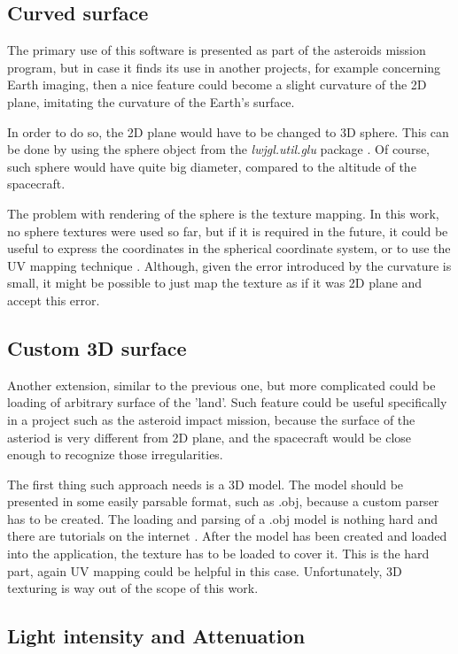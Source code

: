 \documentclass[english,12pt,a4paper,pdftex,elec,utf8]{aaltothesis}
\begin{document}
\subsection*{Curved surface}

The primary use of this software is presented as part of the asteroids mission program, but in case it finds its use in another projects, for example concerning Earth imaging, then a nice feature could become a slight curvature of the 2D plane, imitating the curvature of the Earth's surface. 

In order to do so, the 2D plane would have to be changed to 3D sphere. This can be done by using the sphere object from the \textit{lwjgl.util.glu} package \cite{lwjglSphere}. Of course, such sphere would have quite big diameter, compared to the altitude of the spacecraft. 

The problem with rendering of the sphere is the texture mapping. In this work, no sphere textures were used so far, but if it is required in the future, it could be useful to express the coordinates in the spherical coordinate system, or to use the UV mapping technique \cite{UVmappingWiki}. Although, given the error introduced by the curvature is small, it might be possible to just map the texture as if it was 2D plane and accept this error.

\subsection*{Custom 3D surface}

Another extension, similar to the previous one, but more complicated could be loading of arbitrary surface of the 'land'. Such feature could be useful specifically in a project such as the asteroid impact mission, because the surface of the asteriod is very different from 2D plane, and the spacecraft would be close enough to recognize those irregularities.

The first thing such approach needs is a 3D model. The model should be presented in some easily parsable format, such as .obj, because a custom parser has to be created. The loading and parsing of a .obj model is nothing hard and there are tutorials on the internet \cite{Load3DModel}. After the model has been created and loaded into the application, the texture has to be loaded to cover it. This is the hard part, again UV mapping\cite{UVmappingWiki} could be helpful in this case. Unfortunately, 3D texturing is way out of the scope of this work. 

\subsection*{Light intensity and Attenuation}
\end{document}

